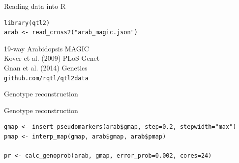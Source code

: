 \documentclass[12pt,t,aspectratio=1610]{beamer}
\begin{document}
\begin{frame}[fragile,c]{Reading data into R}


\begin{center} \begin{minipage}[c]{11.7cm} \begin{semiverbatim}
\lstset{basicstyle=\large}
\begin{lstlisting}[linewidth=11.7cm]
library(qtl2)
arab <- read_cross2("arab_magic.json")
\end{lstlisting}
\end{semiverbatim} \end{minipage} \end{center}


\vfill
\hfill \begin{minipage}[c]{6cm}

  \small
  {\color{title} 19-way Arabidopsis MAGIC} \\
  Kover et al. (2009) PLoS Genet \\
  Gnan et al. (2014) Genetics \\
  {\tt github.com/rqtl/qtl2data}


\end{minipage}


\end{frame}



\begin{frame}[c]{Genotype reconstruction}



\end{frame}




\begin{frame}[c,fragile]{Genotype reconstruction}
\addtocounter{framenumber}{-1}

\begin{center} \begin{minipage}[c]{11.5cm} \begin{semiverbatim}
\begin{lstlisting}[linewidth=11.5cm]
gmap <- insert_pseudomarkers(arab$gmap, step=0.2, stepwidth="max")
pmap <- interp_map(gmap, arab$gmap, arab$pmap)

pr <- calc_genoprob(arab, gmap, error_prob=0.002, cores=24)
\end{lstlisting}
\end{semiverbatim} \end{minipage} \end{center}

\end{frame}
\end{document}
